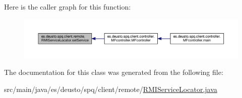 Here is the caller graph for this function\+:\nopagebreak
\begin{figure}[H]
\begin{center}
\leavevmode
\includegraphics[width=350pt]{classes_1_1deusto_1_1spq_1_1client_1_1remote_1_1_r_m_i_service_locator_a2625caab4b56417ab4215c5da02e500e_icgraph}
\end{center}
\end{figure}




The documentation for this class was generated from the following file\+:\begin{DoxyCompactItemize}
\item 
src/main/java/es/deusto/spq/client/remote/\hyperlink{_r_m_i_service_locator_8java}{R\+M\+I\+Service\+Locator.\+java}\end{DoxyCompactItemize}
